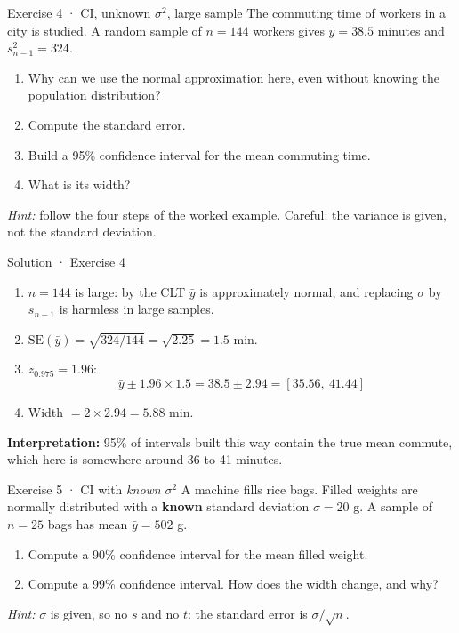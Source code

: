 \documentclass[
  11pt,
  ignorenonframetext,
  aspectratio=169,
]{beamer}
\providecommand{\tightlist}{%
  \setlength{\itemsep}{0pt}\setlength{\parskip}{0pt}}
\newcommand{\se}{\mathrm{SE}}
\begin{document}
\begin{frame}{Exercise 4 · CI, unknown \(\sigma^2\), large sample}
\protect{}\label{exercise-4-ci-unknown-sigma2-large-sample}
The commuting time of workers in a city is studied. A random sample of
\(n=144\) workers gives \(\bar y=38.5\) minutes and \(s^2_{n-1}=324\).

\begin{enumerate}
\tightlist
\item
  Why can we use the normal approximation here, even without knowing the
  population distribution?
\item
  Compute the standard error.
\item
  Build a 95\% confidence interval for the mean commuting time.
\item
  What is its width?
\end{enumerate}

\emph{Hint:} follow the four steps of the worked example. Careful: the
variance is given, not the standard deviation.
\end{frame}

\begin{frame}{Solution · Exercise 4}
\protect{}\label{solution-exercise-4}
\begin{enumerate}
\tightlist
\item
  \(n=144\) is large: by the CLT \(\bar y\) is approximately normal, and
  replacing \(\sigma\) by \(s_{n-1}\) is harmless in large samples.
\item
  \(\se(\bar y)=\sqrt{324/144}=\sqrt{2.25}=\mathbf{1.5}\) min.
\item
  \(z_{0.975}=1.96\):
  \[\bar y\pm1.96\times1.5=38.5\pm2.94=\mathbf{[35.56,\ 41.44]}\]
\item
  Width \(=2\times2.94=\mathbf{5.88}\) min.
\end{enumerate}

\textbf{Interpretation:} 95\% of intervals built this way contain the
true mean commute, which here is somewhere around 36 to 41 minutes.
\end{frame}

\begin{frame}{Exercise 5 · CI with \emph{known} \(\sigma^2\)}
\protect{}\label{exercise-5-ci-with-known-sigma2}
A machine fills rice bags. Filled weights are normally distributed with
a \textbf{known} standard deviation \(\sigma=20\) g. A sample of
\(n=25\) bags has mean \(\bar y=502\) g.

\begin{enumerate}
\tightlist
\item
  Compute a 90\% confidence interval for the mean filled weight.
\item
  Compute a 99\% confidence interval. How does the width change, and
  why?
\end{enumerate}

\emph{Hint:} \(\sigma\) is given, so no \(s\) and no \(t\): the standard
error is \(\sigma/\sqrt n\).
\end{frame}
\end{document}
